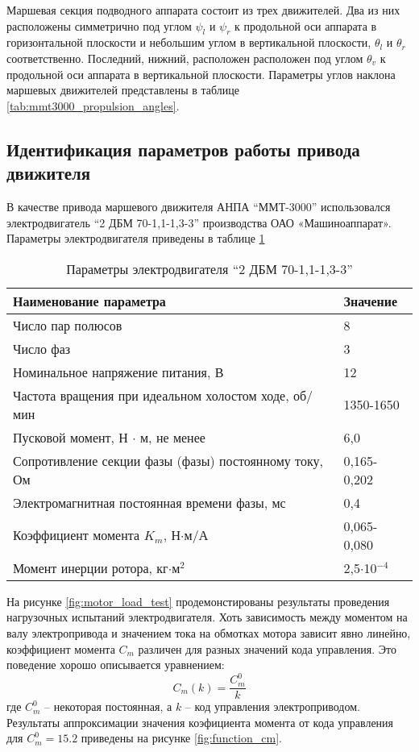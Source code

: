 Маршевая секция подводного аппарата состоит из трех движителей.
Два из них расположены симметрично под углом $\psi_l$ и $\psi_r$ к продольной оси аппарата в горизонтальной плоскости и небольшим углом в вертикальной плоскости, $\theta_l$ и $\theta_r$ соответственно.
Последний, нижний, расположен расположен под углом $\theta_v$ к продольной оси аппарата в вертикальной плоскости.
Параметры углов наклона маршевых движителей представлены в таблице \ref{tab:mmt3000_propulsion_angles}.

\subsection{Идентификация параметров работы привода движителя}
В качестве привода маршевого движителя АНПА ``ММТ-3000'' использовался электродвигатель ``2 ДБМ 70-1,1-1,3-3'' производства ОАО «Машиноаппарат».
Параметры электродвигателя приведены в таблице \ref{tab:mmt300_motor}

\begin{table}
    \caption{Параметры электродвигателя ``2 ДБМ 70-1,1-1,3-3'' }\label{tab:mmt300_motor}
    \centering
    \begin{tabular}{ll}
        \toprule
        Наименование параметра  & Значение\\
        \midrule
        Число пар полюсов & 8 \\
        Число фаз & 3 \\
        Номинальное напряжение питания, В   & 12 \\
        Частота вращения при идеальном холостом ходе, об/мин & 1350-1650 \\
        Пусковой момент, Н $\cdot$ м, не менее      & 6,0 \\
        Сопротивление секции фазы (фазы) постоянному току, Ом & 0,165-0,202 \\
        Электромагнитная постоянная времени фазы, мс & 0,4 \\
        Коэффициент момента $K_m$, Н$\cdot$м/А   & 0,065-0,080   \\
        Момент инерции ротора, кг$\cdot$м$^2$   & 2,5$\cdot$10$^{-4}$ \\
        \bottomrule
    \end{tabular}
\end{table}
На рисунке \ref{fig:motor_load_test} продемонстированы результаты проведения нагрузочных испытаний электродвигателя.
Хоть зависимость между моментом на валу электропривода и значением тока на обмотках мотора зависит явно линейно, коэффициент момента $C_m$ различен для разных значений кода управления.
Это поведение хорошо описывается уравнением:
\begin{equation*}
    C_m(k) = \frac{C_m^0}{k}
\end{equation*}
\noindent где $C_m^0$ -- некоторая постоянная, а $k$ -- код управления электроприводом.
Результаты аппроксимации значения коэфициента момента от кода управления для $C_m^0 = 15.2$ приведены на рисунке \ref{fig:function_cm}.

